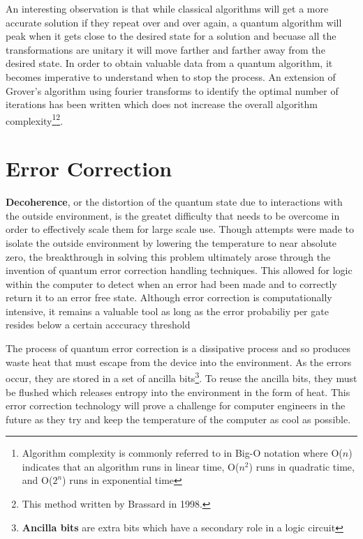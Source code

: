 \documentclass[12pt]{article}
\begin{document}
An interesting observation is that while classical algorithms will get a more accurate solution if they repeat over and over again, a quantum algorithm will peak when it gets close to the desired state for a solution and becuase all the transformations are unitary it will move farther and farther away from the desired state. In order to obtain valuable data from a quantum algorithm, it becomes imperative to understand when to stop the process. An extension of Grover's algorithm using fourier transforms to identify the optimal number of iterations has been written which does not increase the overall algorithm complexity\footnote{Algorithm complexity is commonly referred to in Big-O notation where O($n$) indicates that an algorithm runs in linear time, O($n^2$) runs in quadratic time, and O($2^n$) runs in exponential time}\footnote{This method written by Brassard in 1998\cite{non}.}.
\section{Error Correction}
\textbf{Decoherence}, or the distortion of the quantum state due to interactions with the outside environment, is the greatet difficulty that needs to be overcome in order to effectively scale them for large scale use.\cite{non} Though attempts were made to isolate the outside environment by lowering the temperature to near absolute zero, the breakthrough in solving this problem ultimately arose through the invention of quantum error correction handling techniques. This allowed for logic within the computer to detect when an error had been made and to correctly return it to an error free state. Although error correction is computationally intensive, it remains a valuable tool as long as the error probabiliy per gate resides below a certain acccuracy threshold
\par
The process of quantum error correction is a dissipative process and so produces waste heat that must escape from the device into the environment. As the errors occur, they are stored in a set of ancilla bits\footnote{\textbf{Ancilla bits} are extra bits which have a secondary role in a logic circuit}. To reuse the ancilla bits, they must be flushed which releases entropy into the environment in the form of heat.\cite{pro} This error correction technology will prove a challenge for computer engineers in the future as they try and keep the temperature of the computer as cool as possible.\par
\end{document}
